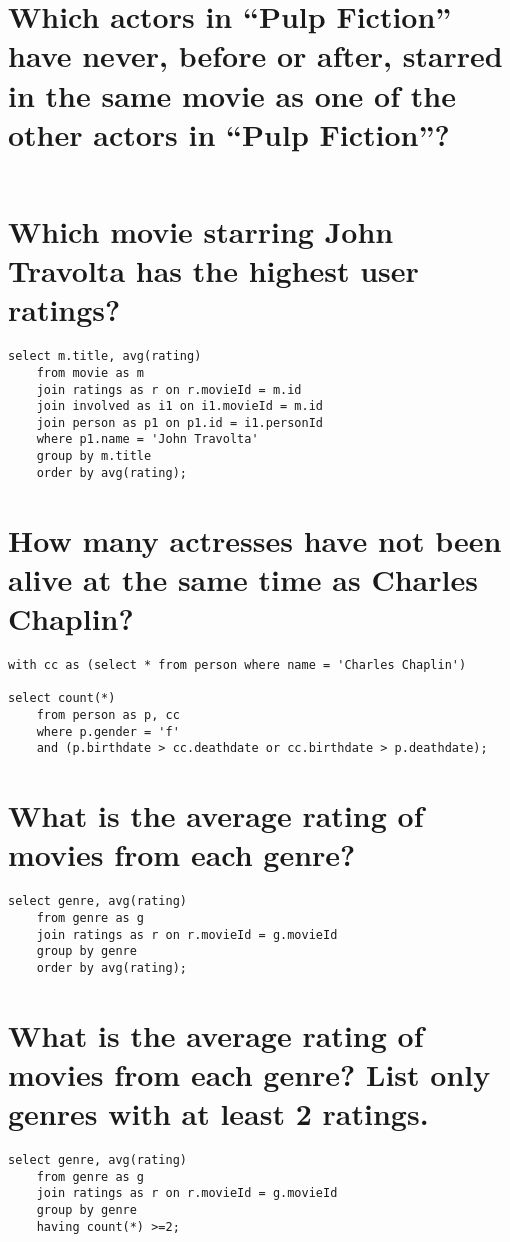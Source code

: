 \documentclass[a4paper,11pt]{memoir}
\begin{document}
\section{Which actors in ``Pulp Fiction'' have never, before or after, starred in the same movie as one of the other actors in ``Pulp Fiction''?}
\begin{lstlisting}

\end{lstlisting}

\section{Which movie starring John Travolta has the highest user ratings?}
\begin{lstlisting}
select m.title, avg(rating)
	from movie as m
	join ratings as r on r.movieId = m.id
	join involved as i1 on i1.movieId = m.id
	join person as p1 on p1.id = i1.personId
	where p1.name = 'John Travolta'
	group by m.title
	order by avg(rating);
\end{lstlisting}

\section{How many actresses have not been alive at the same time as Charles Chaplin?}
\begin{lstlisting}
with cc as (select * from person where name = 'Charles Chaplin')

select count(*)
	from person as p, cc
	where p.gender = 'f' 
	and (p.birthdate > cc.deathdate or cc.birthdate > p.deathdate);
\end{lstlisting}

\section{What is the average rating of movies from each genre?}
\begin{lstlisting}
select genre, avg(rating)
	from genre as g
	join ratings as r on r.movieId = g.movieId
	group by genre
	order by avg(rating);
\end{lstlisting}

\section{What is the average rating of movies from each genre? List only genres with at least 2 ratings.}
\begin{lstlisting}
select genre, avg(rating)
	from genre as g
	join ratings as r on r.movieId = g.movieId
	group by genre
	having count(*) >=2;
\end{lstlisting}
\end{document}
